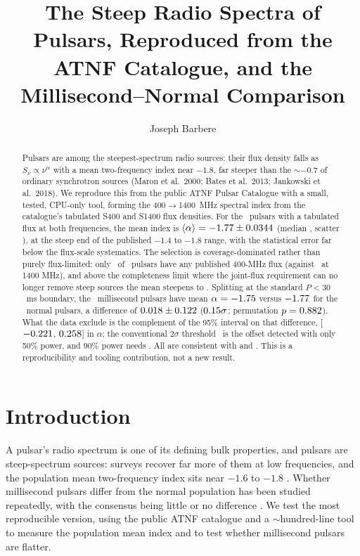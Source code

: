 \documentclass[twocolumn]{aastex631}
\begin{document}
\title{The Steep Radio Spectra of Pulsars, Reproduced from the ATNF Catalogue, and the
Millisecond--Normal Comparison}

\author[0009-0008-3289-4447]{Joseph Barbere}

\begin{abstract}
Pulsars are among the steepest-spectrum radio sources: their flux density falls as
$S_\nu\propto\nu^\alpha$ with a mean two-frequency index near $-1.8$, far steeper than the $\sim-0.7$
of ordinary synchrotron sources (Maron et al.\ 2000; Bates et al.\ 2013; Jankowski et al.\ 2018). We
reproduce this from the public ATNF Pulsar Catalogue \citep{atnf} with a small, tested, CPU-only tool,
forming the 400$\to$1400~MHz spectral index from the catalogue's tabulated S400 and S1400 flux
densities. For the \psrN\ pulsars with a tabulated flux at both frequencies, the mean index is
$\langle\alpha\rangle=-1.77\pm0.0344$ (median \psrMedianAlpha, scatter \psrStdAlpha), at the steep end of the published $-1.4$ to $-1.8$ range, with the statistical
error far below the flux-scale systematics. The selection is coverage-dominated rather than purely
flux-limited:
only \psrNSfourHundred\ of \psrNcatalogue\ pulsars have any published 400-MHz flux (against
\psrNSfourteenHundred\ at 1400 MHz), and above the completeness limit where the joint-flux
requirement can no longer remove steep sources the mean steepens to \psrCompleteMean. Splitting at
the standard $P<30$~ms boundary, the \psrNmsp\ millisecond pulsars have mean
$\alpha=-1.75$ versus $-1.77$ for the \psrNnormal\ normal pulsars, a
difference of $0.018\pm0.122$ ($0.15\sigma$; permutation
$p=0.882$). What the data exclude is the complement of the 95\% interval on that difference,
[$-0.221$, $0.258$] in $\alpha$; the conventional $2\sigma$ threshold \psrAlphaResolvable\ is
the offset detected with only 50\% power, and 90\% power needs \psrNinetyPower. All are consistent
with \citet{kramer1998} and \citet{jankowski2018}. This is a reproducibility and tooling
contribution, not a new result.
\end{abstract}


\section{Introduction}
A pulsar's radio spectrum is one of its defining bulk properties, and pulsars are steep-spectrum
sources: surveys recover far more of them at low frequencies, and the population mean
two-frequency index sits near $-1.6$ to $-1.8$ \citep{maron2000,bates2013,jankowski2018}. Whether
millisecond pulsars differ from the normal population has been studied repeatedly, with the consensus
being little or no difference \citep{kramer1998,jankowski2018}. We test the most reproducible version,
using the public ATNF catalogue and a $\sim$hundred-line tool to measure the population mean index
and to test whether millisecond pulsars are flatter.
\end{document}
